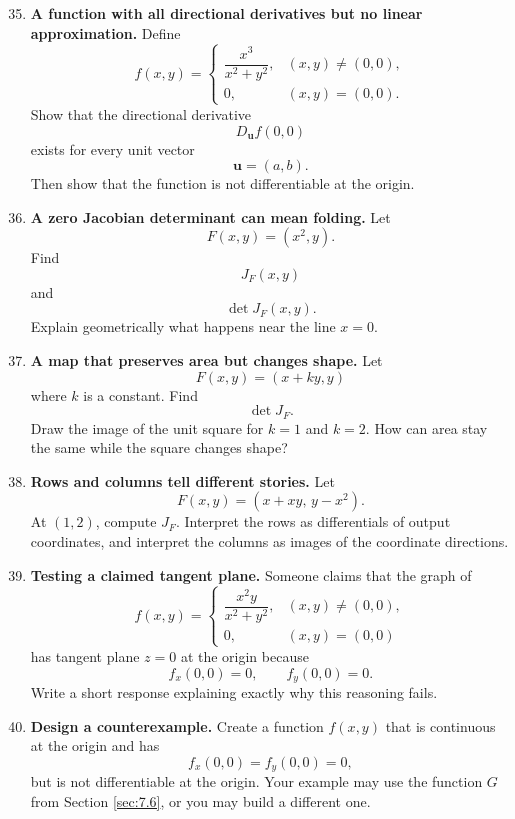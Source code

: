 \begin{enumerate}
\setcounter{enumi}{34}

\item \textbf{A function with all directional derivatives but no linear approximation.}
Define
\[
    f(x,y)=
    \begin{cases}
    \dfrac{x^3}{x^2+y^2}, & (x,y)\ne(0,0),\\[2mm]
    0, & (x,y)=(0,0).
    \end{cases}
\]
Show that the directional derivative
\[
    D_{\mathbf u}f(0,0)
\]
exists for every unit vector
\[
    \mathbf u=(a,b).
\]
Then show that the function is not differentiable at the origin.

\item \textbf{A zero Jacobian determinant can mean folding.}
Let
\[
    F(x,y)=(x^2,y).
\]
Find
\[
    J_F(x,y)
\]
and
\[
    \det J_F(x,y).
\]
Explain geometrically what happens near the line \(x=0\).

\item \textbf{A map that preserves area but changes shape.}
Let
\[
    F(x,y)=(x+ky,y)
\]
where \(k\) is a constant.  Find
\[
    \det J_F.
\]
Draw the image of the unit square for \(k=1\) and \(k=2\).  How can area stay the
same while the square changes shape?

\item \textbf{Rows and columns tell different stories.}
Let
\[
    F(x,y)=
    \left(
        x+xy,\,
        y-x^2
    \right).
\]
At \((1,2)\), compute \(J_F\).  Interpret the rows as differentials of output
coordinates, and interpret the columns as images of the coordinate directions.

\item \textbf{Testing a claimed tangent plane.}
Someone claims that the graph of
\[
    f(x,y)=
    \begin{cases}
    \dfrac{x^2y}{x^2+y^2}, & (x,y)\ne(0,0),\\[2mm]
    0, & (x,y)=(0,0)
    \end{cases}
\]
has tangent plane \(z=0\) at the origin because
\[
    f_x(0,0)=0,\qquad f_y(0,0)=0.
\]
Write a short response explaining exactly why this reasoning fails.

\item \textbf{Design a counterexample.}
Create a function \(f(x,y)\) that is continuous at the origin and has
\[
    f_x(0,0)=f_y(0,0)=0,
\]
but is not differentiable at the origin.  Your example may use the function \(G\) from
Section \ref{sec:7.6}, or you may build a different one.


\end{enumerate}
